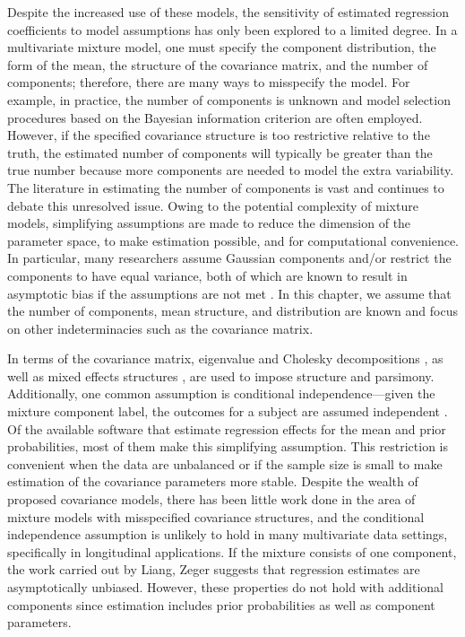  Despite the increased use of these models, the sensitivity of estimated regression coefficients to model assumptions has only been explored to a limited degree. In a multivariate mixture model, one must specify the component distribution, the form of the mean, the structure of the covariance matrix, and the number of components; therefore, there are many ways to misspecify the model. For example, in practice, the number of components is unknown and model selection procedures based on the Bayesian information criterion are often employed. However, if the specified covariance structure is too restrictive relative to the truth, the estimated number of components will typically be greater than the true number because more components are needed to model the extra variability. The literature in estimating the number of components is  vast \cite{oliveira2005} and continues to debate this unresolved issue. Owing to the potential complexity of mixture models, simplifying assumptions are made to reduce the dimension of the parameter space, to make estimation possible, and for computational convenience. In particular, many researchers assume Gaussian components and/or restrict the components to have equal variance, both of which are known to result in asymptotic bias if the assumptions are not met \cite{gray1994, lo2011}. In this chapter, we assume that the number of components, mean structure, and distribution are known and focus on other indeterminacies such as the covariance matrix.
 
In terms of the covariance matrix, eigenvalue and Cholesky decompositions \cite{banfield1993,mcnicholas2010}, as well as mixed effects structures \cite{muthen1999}, are used to impose structure and parsimony. Additionally, one common assumption is conditional independence---given the mixture component label, the outcomes for a subject are assumed independent \cite{ostbye2011,muthen2008}. Of the available software that estimate regression effects for the mean and prior probabilities, most of them make this simplifying assumption. This restriction is convenient when the data are unbalanced or if the sample size is small to make estimation of the covariance parameters more stable. Despite the wealth of proposed covariance models, there has been little work done in the area of mixture models with misspecified covariance structures, and the conditional independence assumption is unlikely to hold in many multivariate data settings, specifically in longitudinal applications. If the mixture consists of one component, the work carried out by Liang, Zeger \cite{liang1986} suggests that regression estimates are asymptotically unbiased. However, these properties do not hold with additional components since estimation includes prior probabilities as well as component parameters. 

